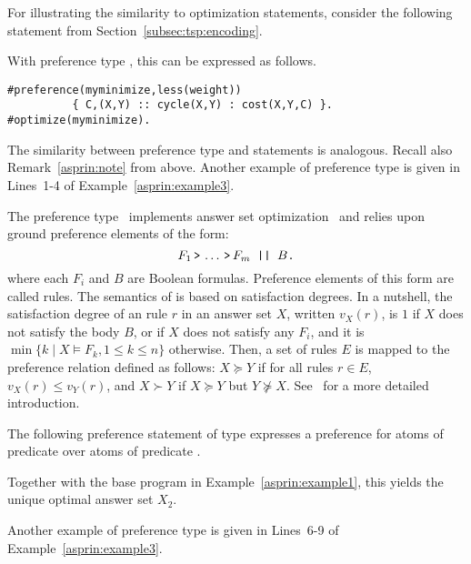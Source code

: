 For illustrating the similarity to optimization statements,
consider the following  statement from Section~\ref{subsec:tsp:encoding}.
%

%
With preference type ,
this can be expressed as follows.
\begin{lstlisting}[numbers=none]
#preference(myminimize,less(weight))
          { C,(X,Y) :: cycle(X,Y) : cost(X,Y,C) }.
#optimize(myminimize).
\end{lstlisting}
The similarity between  preference type  and  statements is analogous.
Recall also Remark~\ref{asprin:note} from above.
%
Another example of preference type  is given in Lines~1-4 of Example~\ref{asprin:example3}.

The preference type~ implements answer set optimization~\cite{brnitr03a} and relies upon
ground preference elements of the form:
\[ F_1 \, \texttt{>} \, \dots \, \texttt{>} \, F_m \texttt{ || }B\texttt{.}\]
where each $F_i$ and $B$ are Boolean formulas.
Preference elements of this form are called  rules.  
The semantics of  is based on satisfaction degrees.
In a nutshell,
the satisfaction degree of an  rule $r$ in an answer set $X$, 
written $v_X(r)$, is 
$1$ if $X$ does not satisfy the body $B$, %
or  if $X$ does not satisfy any $F_i$, 
and it is $\min\{k \mid X \models F_k, 1\leq k\leq n\}$ otherwise.
Then, a set of  rules $E$ is mapped to the preference relation defined as follows:
$X \succeq Y$ if for all rules $r \in E$, $v_X(r) \leq v_Y(r)$, 
and $X \succ Y$ if $X \succeq Y$ but $Y \not\succeq X$. 
See~\cite{brnitr03a} for a more detailed introduction.

%
\begin{example}\label{asprin:asoexample}
%
%
The following preference statement of type  expresses a preference 
for atoms of predicate  over atoms of predicate .
%

%
Together with the base program in Example~\ref{asprin:example1}, this yields the unique optimal answer set $X_2$.  
\end{example} %
Another example of preference type \code{aso} is given in Lines~6-9 of Example~\ref{asprin:example3}.

